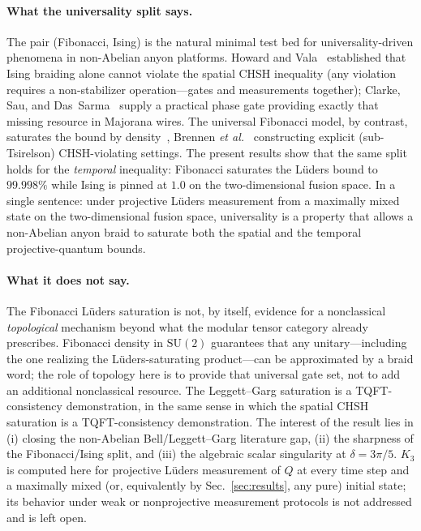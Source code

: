 \documentclass[aps,prx,reprint,amsmath,amssymb,floatfix,nofootinbib,superscriptaddress]{revtex4-2}
\begin{document}
\paragraph{What the universality split says.}
The pair (Fibonacci, Ising) is the natural minimal test bed for
universality-driven phenomena in non-Abelian anyon platforms.
Howard and Vala~\cite{HowardVala2012} established that Ising braiding
alone cannot violate the spatial CHSH inequality (any violation
requires a non-stabilizer operation---gates and measurements
together); Clarke, Sau, and
Das~Sarma~\cite{ClarkeSauDasSarma2016} supply a practical phase gate
providing exactly that missing resource in Majorana wires. The
universal Fibonacci model, by contrast, saturates the bound by
density~\cite{NayakSimonStern2008}, Brennen \emph{et al.}~\cite{Brennen2009}
constructing explicit (sub-Tsirelson) CHSH-violating settings. The present results
show that the same split holds for the \emph{temporal} inequality:
Fibonacci saturates the L\"uders bound to $99.998\%$ while Ising is
pinned at $1.0$ on the two-dimensional fusion space. In a single
sentence: under projective L\"uders measurement from a maximally mixed
state on the two-dimensional fusion space, universality is a property
that allows a non-Abelian anyon braid to saturate both the spatial
and the temporal projective-quantum bounds.

\paragraph{What it does not say.}
The Fibonacci L\"uders saturation is not, by itself, evidence for a
nonclassical \emph{topological} mechanism beyond what the modular
tensor category already prescribes. Fibonacci density in
$\mathrm{SU}(2)$ guarantees that any unitary---including the one
realizing the L\"uders-saturating product---can be approximated by a
braid word; the role of topology here is to provide that universal
gate set, not to add an additional nonclassical resource. The
Leggett--Garg saturation is a TQFT-consistency demonstration, in the
same sense in which the spatial CHSH saturation is a TQFT-consistency
demonstration. The interest of the result lies in (i) closing the
non-Abelian Bell/Leggett--Garg literature gap, (ii) the sharpness of the
Fibonacci/Ising split, and (iii) the algebraic scalar singularity at
$\delta = 3\pi/5$. $K_{3}$ is computed here for
projective L\"uders measurement of $Q$ at every time step and a
maximally mixed (or, equivalently by Sec.~\ref{sec:results}, any
pure) initial state; its behavior under weak or nonprojective
measurement protocols is not addressed and is left open.
\end{document}
